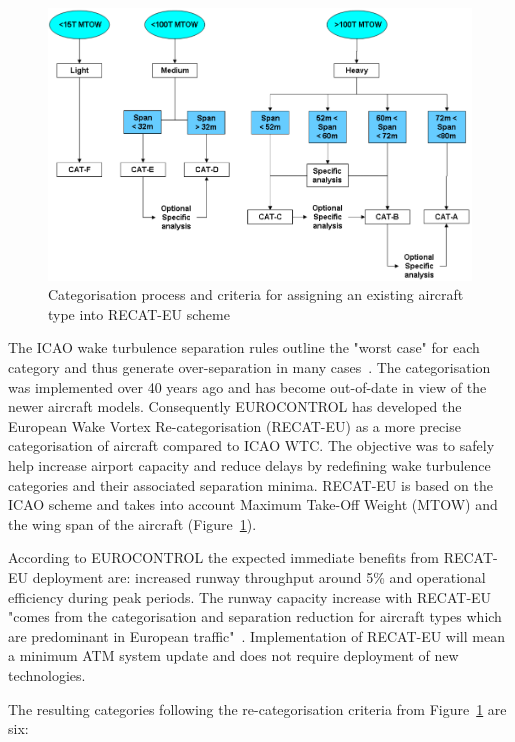 \begin{figure}[h]
    \centering
    \includegraphics[width=1\textwidth]{graphics/Criteria_RECAT.png}
    \caption[RECAT-EU categorisation criteria]{Categorisation process and criteria for assigning an existing aircraft type into RECAT-EU scheme~\cite[p.~15]{rooseleer2015recat}} \label{fig:RECAT_criteria}
\end{figure}

The ICAO wake turbulence separation rules outline the "worst case" for each category and thus generate over-separation in many cases~\cite{noauthor_recat_2018, rooseleer2015recat}. The categorisation was implemented over 40 years ago and has become out-of-date in view of the newer aircraft models. Consequently EUROCONTROL has developed the European Wake Vortex Re-categorisation (RECAT-EU) as a more precise categorisation of aircraft compared to ICAO WTC. The objective was to safely help increase airport capacity and reduce delays by redefining wake turbulence categories and their associated separation 
minima. RECAT-EU is based on the ICAO scheme and takes into account Maximum Take-Off Weight (MTOW) and the wing span of the aircraft (Figure~\ref{fig:RECAT_criteria}).

According to EUROCONTROL the expected immediate benefits from RECAT-EU deployment are: increased runway throughput around 5\% and operational efficiency during peak periods. The runway capacity increase with RECAT-EU "comes from the categorisation and separation reduction for aircraft types which are predominant in European traffic"~\cite[p.~22]{rooseleer2015recat}. Implementation of RECAT-EU will mean a minimum ATM system update and does not require deployment of new technologies.

The resulting categories following the re-categorisation criteria from Figure~\ref{fig:RECAT_criteria} are six:

